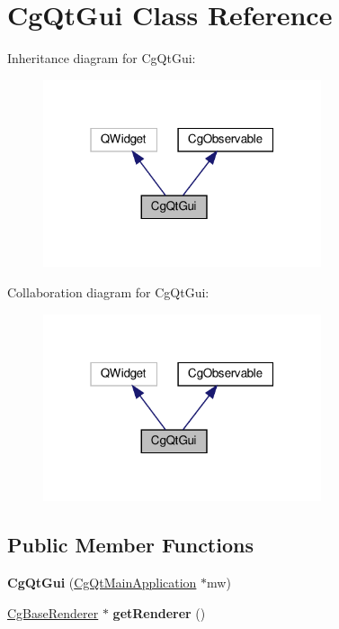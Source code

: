 \hypertarget{class_cg_qt_gui}{}\section{Cg\+Qt\+Gui Class Reference}
\label{class_cg_qt_gui}


Inheritance diagram for Cg\+Qt\+Gui\+:
\nopagebreak
\begin{figure}[H]
\begin{center}
\leavevmode
\includegraphics[width=232pt]{class_cg_qt_gui__inherit__graph}
\end{center}
\end{figure}


Collaboration diagram for Cg\+Qt\+Gui\+:
\nopagebreak
\begin{figure}[H]
\begin{center}
\leavevmode
\includegraphics[width=232pt]{class_cg_qt_gui__coll__graph}
\end{center}
\end{figure}
\subsection*{Public Member Functions}
\begin{DoxyCompactItemize}
\item 
\mbox{\label{class_cg_qt_gui_afbdd073e9f703fae7e5f14c62d3dddb6}} 
{\bfseries Cg\+Qt\+Gui} (\hyperlink{class_cg_qt_main_application}{Cg\+Qt\+Main\+Application} $\ast$mw)
\item 
\mbox{\label{class_cg_qt_gui_a04f9faf8947b960681bf08e800d1887b}} 
\hyperlink{class_cg_base_renderer}{Cg\+Base\+Renderer} $\ast$ {\bfseries get\+Renderer} ()
\end{DoxyCompactItemize}
